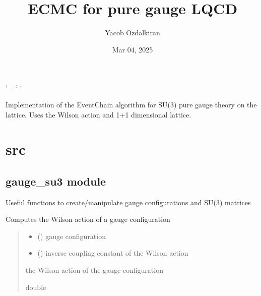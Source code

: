 \documentclass[letterpaper,10pt,english]{sphinxmanual}
\title{ECMC for pure gauge LQCD}
\date{Mar 04, 2025}
\author{Yacob Ozdalkiran}
\begin{document}
\ifdefined\shorthandoff
  \ifnum\catcode`\=\string=\active\shorthandoff{=}\fi
  \ifnum\catcode`\"=\active{}\fi
\fi

\pagestyle{empty}
\sphinxmaketitle
\pagestyle{plain}
\sphinxtableofcontents
\pagestyle{normal}
\label{\detokenize{index::doc}}


\sphinxAtStartPar
Implementation of the Event\sphinxhyphen{}Chain algorithm for SU(3) pure gauge theory on the lattice.
Uses the Wilson action and 1+1 dimensional lattice.



\chapter{src}
\label{\detokenize{modules:src}}\label{\detokenize{modules::doc}}
\sphinxstepscope


\section{gauge\_su3 module}
\label{\detokenize{gauge_su3:module-gauge_su3}}\label{\detokenize{gauge_su3:gauge-su3-module}}\label{\detokenize{gauge_su3::doc}}
\sphinxAtStartPar
Useful functions to create/manipulate gauge configurations and SU(3) matrices

\begin{fulllineitems}
\label{\detokenize{gauge_su3:gauge_su3.calculate_action}}
\pysigstartsignatures
\pysiglinewithargsret
{}
{\sphinxparamcomma {}}
{}
\pysigstopsignatures
\sphinxAtStartPar
Computes the Wilson action of a gauge configuration
\begin{quote}\begin{description}
\begin{itemize}
\item {} 
\sphinxAtStartPar
{} () \textendash{} gauge configuration

\item {} 
\sphinxAtStartPar
{} () \textendash{} inverse coupling constant of the Wilson action

\end{itemize}

\sphinxAtStartPar
the Wilson action of the gauge configuration

\sphinxAtStartPar
double

\end{description}\end{quote}

\end{fulllineitems}
\end{document}
